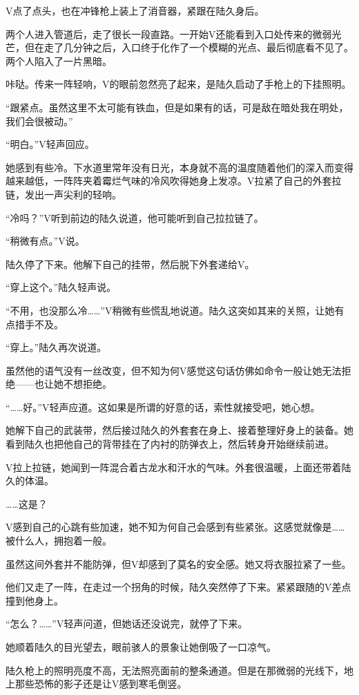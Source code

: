 V点了点头，也在冲锋枪上装上了消音器，紧跟在陆久身后。

两个人进入管道后，走了很长一段直路。一开始V还能看到入口处传来的微弱光芒，但在走了几分钟之后，入口终于化作了一个模糊的光点、最后彻底看不见了。两个人陷入了一片黑暗。

咔哒。传来一阵轻响，V的眼前忽然亮了起来，是陆久启动了手枪上的下挂照明。

“跟紧点。虽然这里不太可能有铁血，但是如果有的话，可是敌在暗处我在明处，我们会很被动。”

“明白。”V轻声回应。

她感到有些冷。下水道里常年没有日光，本身就不高的温度随着他们的深入而变得越来越低，一阵阵夹着霉烂气味的冷风吹得她身上发凉。V拉紧了自己的外套拉链，发出一声尖利的轻响。

“冷吗？”V听到前边的陆久说道，他可能听到自己拉拉链了。

“稍微有点。”V说。

陆久停了下来。他解下自己的挂带，然后脱下外套递给V。

“穿上这个。”陆久轻声说。

“不用，也没那么冷……”V稍微有些慌乱地说道。陆久这突如其来的关照，让她有点措手不及。

“穿上。”陆久再次说道。

虽然他的语气没有一丝改变，但不知为何V感觉这句话仿佛如命令一般让她无法拒绝——也让她不想拒绝。

“……好。”V轻声应道。这如果是所谓的好意的话，索性就接受吧，她心想。

她解下自己的武装带，然后接过陆久的外套套在身上、接着整理好身上的装备。她看到陆久也把他自己的背带挂在了内衬的防弹衣上，然后转身开始继续前进。

V拉上拉链，她闻到一阵混合着古龙水和汗水的气味。外套很温暖，上面还带着陆久的体温。

……这是？

V感到自己的心跳有些加速，她不知为何自己会感到有些紧张。这感觉就像是……被什么人，拥抱着一般。

虽然这间外套并不能防弹，但V却感到了莫名的安全感。她又将衣服拉紧了一些。

他们又走了一阵，在走过一个拐角的时候，陆久突然停了下来。紧紧跟随的V差点撞到他身上。

“怎么？……”V轻声问道，但她话还没说完，就停了下来。

她顺着陆久的目光望去，眼前骇人的景象让她倒吸了一口凉气。

陆久枪上的照明亮度不高，无法照亮面前的整条通道。但是在那微弱的光线下，地上那些恐怖的影子还是让V感到寒毛倒竖。

